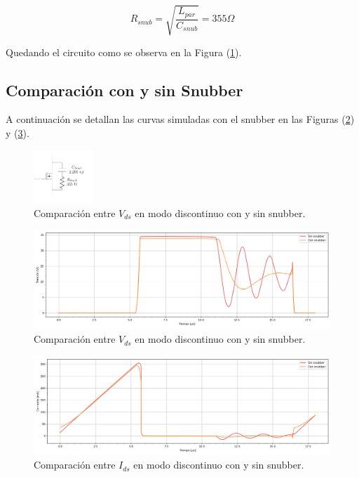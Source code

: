 \begin{equation}
	R_{snub} = \sqrt{\frac{L_{par}}{C_{snub}}} = 355\Omega
\end{equation}


Quedando el circuito como se observa en la Figura (\ref{ej4:fig:vds_comp}). 

\subsection{Comparación con y sin Snubber}

A continuación se detallan las curvas simuladas con el snubber en las Figuras (\ref{ej4:fig:vds_snub}) y (\ref{ej4:fig:il_snub}).

\begin{figure}[H]
		\centering
		\includegraphics[width=0.2\textwidth,page=1]{ImagenesEjercicio-4/CircuitsEj4.pdf}	%
		\caption{Comparación entre $V_{ds}$ en modo discontinuo con y sin snubber.}
		\label{ej4:fig:vds_comp}
\end{figure}


\begin{figure}[H]
	\centering
	\includegraphics[width=\linewidth]{ImagenesEjercicio-4/comparacion-vds}
	\caption{Comparación entre $V_{ds}$ en modo discontinuo con y sin snubber.}
	\label{ej4:fig:vds_snub}
\end{figure}

\begin{figure}[H]
	\centering
	\includegraphics[width=\linewidth]{ImagenesEjercicio-4/comparacion-ids}
	\caption{Comparación entre $I_{ds}$ en modo discontinuo con y sin snubber.}
	\label{ej4:fig:il_snub}
\end{figure}

